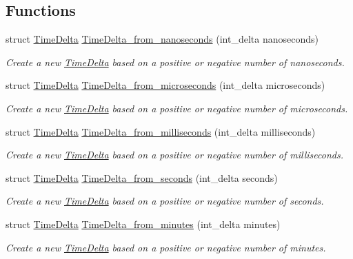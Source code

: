 \subsection*{\-Functions}
\begin{DoxyCompactItemize}
\item 
struct \hyperlink{structTimeDelta}{\-Time\-Delta} \hyperlink{time-delta_8h_a4d69e5c655907802b1278e2bc0567c6b}{\-Time\-Delta\-\_\-from\-\_\-nanoseconds} (int\-\_\-delta nanoseconds)
\begin{DoxyCompactList}\small\item\em \-Create a new \hyperlink{structTimeDelta}{\-Time\-Delta} based on a positive or negative number of nanoseconds. \end{DoxyCompactList}\item 
struct \hyperlink{structTimeDelta}{\-Time\-Delta} \hyperlink{time-delta_8h_a8a5b10cada34e6093d985bb757671842}{\-Time\-Delta\-\_\-from\-\_\-microseconds} (int\-\_\-delta microseconds)
\begin{DoxyCompactList}\small\item\em \-Create a new \hyperlink{structTimeDelta}{\-Time\-Delta} based on a positive or negative number of microseconds. \end{DoxyCompactList}\item 
struct \hyperlink{structTimeDelta}{\-Time\-Delta} \hyperlink{time-delta_8h_ae7919eccd5d372f5f954d560792699b5}{\-Time\-Delta\-\_\-from\-\_\-milliseconds} (int\-\_\-delta milliseconds)
\begin{DoxyCompactList}\small\item\em \-Create a new \hyperlink{structTimeDelta}{\-Time\-Delta} based on a positive or negative number of milliseconds. \end{DoxyCompactList}\item 
struct \hyperlink{structTimeDelta}{\-Time\-Delta} \hyperlink{time-delta_8h_ae0ba972261d5dd8b375af9b207311baf}{\-Time\-Delta\-\_\-from\-\_\-seconds} (int\-\_\-delta seconds)
\begin{DoxyCompactList}\small\item\em \-Create a new \hyperlink{structTimeDelta}{\-Time\-Delta} based on a positive or negative number of seconds. \end{DoxyCompactList}\item 
struct \hyperlink{structTimeDelta}{\-Time\-Delta} \hyperlink{time-delta_8h_a18b5bed19a394a36890c2578fe05e5b1}{\-Time\-Delta\-\_\-from\-\_\-minutes} (int\-\_\-delta minutes)
\begin{DoxyCompactList}\small\item\em \-Create a new \hyperlink{structTimeDelta}{\-Time\-Delta} based on a positive or negative number of minutes. \end{DoxyCompactList}\item 

\end{DoxyCompactItemize}

